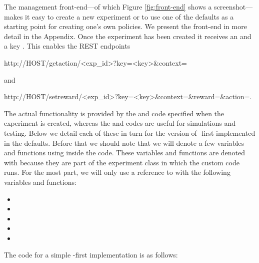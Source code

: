 \documentclass[nojss]{jss}
\begin{document}
The management front-end---of which Figure \ref{fig:front-end} shows  a screenshot---makes it easy to create a new experiment or to use  one of the defaults as a starting point for creating one's own policies. We present the front-end in more detail in the Appendix. Once the experiment has been created it receives an  and a key . This enables the REST endpoints
\begin{Code} 
http://HOST/getaction/<exp_id>?key=<key>&context={}
\end{Code}  
and
\begin{Code} 
http://HOST/setreward/<exp_id>?key=<key>&context={}&reward={}&action={}.
\end{Code} 

The actual functionality is provided by the  and  code specified when the experiment is created, whereas the  and  codes are useful for simulations and testing. Below we detail each of these in turn for the version of -first implemented in the defaults. Before that we should note that we will denote a few variables and functions using  inside the code. These variables and functions are denoted with  because they are part of the experiment class in which the custom code runs. For the most part, we will only use a reference to  with the following variables and functions:

\begin{itemize}

\item {}
\item {}
\item {}
\item {}
\item {}
\end{itemize}

The code for a simple -first implementation is as follows:
\end{document}
